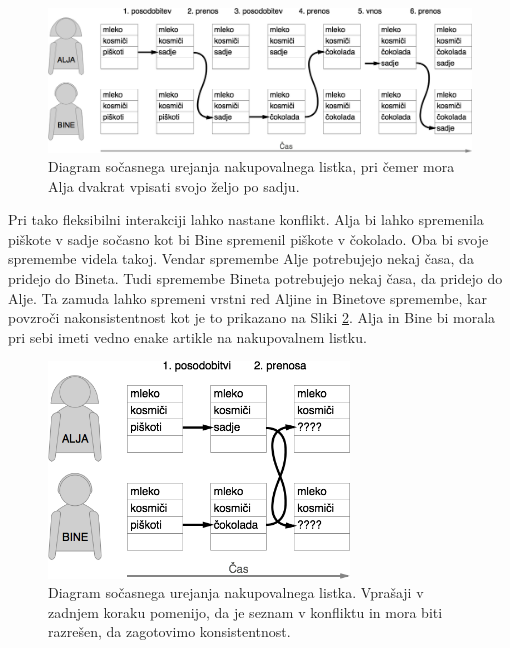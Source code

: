 \documentclass[a4paper, 12pt, twoside]{book}
\begin{document}
\pagebreak

\begin{figure}[placement h]
\begin{center}
\includegraphics[width=16cm]{problem1.png}
\end{center}
\caption{Diagram sočasnega urejanja nakupovalnega listka, pri čemer mora Alja dvakrat vpisati svojo željo po sadju.}
\label{problem1}
\end{figure}

Pri tako fleksibilni interakciji lahko nastane konflikt. Alja bi lahko spremenila piškote v sadje sočasno kot bi Bine spremenil piškote v čokolado. Oba bi svoje spremembe videla takoj. Vendar spremembe Alje potrebujejo nekaj časa, da pridejo do Bineta. Tudi spremembe Bineta potrebujejo nekaj časa, da pridejo do Alje. Ta zamuda lahko spremeni vrstni red Aljine in Binetove spremembe, kar povzroči nakonsistentnost kot je to prikazano na Sliki \ref{problem2}. Alja in Bine bi morala pri sebi imeti vedno enake artikle na nakupovalnem listku.

\begin{figure}[placement h]
\begin{center}
\includegraphics[width=8cm]{problem2.png}
\end{center}
\caption{Diagram sočasnega urejanja nakupovalnega listka. Vprašaji v zadnjem koraku pomenijo, da je seznam v konfliktu in mora biti razrešen, da zagotovimo konsistentnost. }
\label{problem2}
\end{figure}
\end{document}
